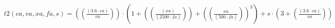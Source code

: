 \documentclass[preview,border=1pt]{standalone}
\begin{document}
$
t2 (ca,va,xa,fa,s) = \left(\left(\frac{\left(\num{3.6}\cdot ca\right)}{va}\right)\right)\cdot \left(\num{1}+\left(\left(\frac{\left(xa\right)}{\left(\num{2500}\cdot fa\right)}\right)\right)+\left(\left(\frac{xa}{\left(\num{500}\cdot fa\right)}\right)\right)^{\num{3}}\right)+s\cdot \left(\num{3}+\left(\frac{\left(\num{3.6}\cdot ca\right)}{va}\right)\right)
$
\end{document}
